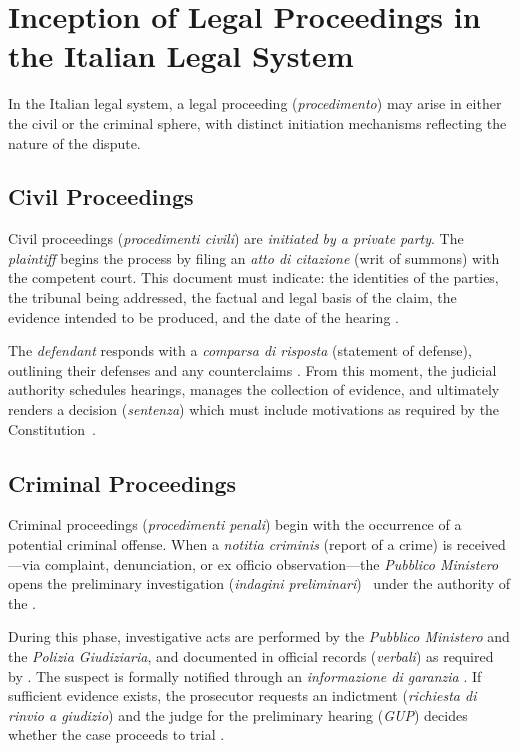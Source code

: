 


\section{Inception of Legal Proceedings in the Italian Legal System}

In the Italian legal system, a legal proceeding (\textit{procedimento}) may arise in either the civil or the criminal sphere, with distinct initiation mechanisms reflecting the nature of the dispute.

\subsection{Civil Proceedings}

Civil proceedings (\textit{procedimenti civili}) are \emph{initiated by a private party}. The \emph{plaintiff} begins the process by filing an \textit{atto di citazione} (writ of summons) with the competent court. This document must indicate: the identities of the parties, the tribunal being addressed, the factual and legal basis of the claim, the evidence intended to be produced, and the date of the hearing \cite[Article 163]{CPC}. 

The \emph{defendant} responds with a \textit{comparsa di risposta} (statement of defense), outlining their defenses and any counterclaims \cite[Article 167]{CPC}. From this moment, the judicial authority schedules hearings, manages the collection of evidence, and ultimately renders a decision (\textit{sentenza}) which must include motivations as required by the Constitution~\cite[Article 111]{Costituzione}.

\subsection{Criminal Proceedings}

Criminal proceedings (\textit{procedimenti penali}) begin with the occurrence of a potential criminal offense. When a \emph{notitia criminis} (report of a crime) is received---via complaint, denunciation, or ex officio observation---the \textit{Pubblico Ministero} opens the preliminary investigation (\textit{indagini preliminari})~\cite[Article 326]{CPP} under the authority of the \textcite{CPP}. 

During this phase, investigative acts are performed by the \textit{Pubblico Ministero} and the \textit{Polizia Giudiziaria}, and documented in official records (\textit{verbali}) as required by \cite[Article 373]{CPP}. The suspect is formally notified through an \textit{informazione di garanzia} \cite[Article 369]{CPP}. If sufficient evidence exists, the prosecutor requests an indictment (\textit{richiesta di rinvio a giudizio}) and the judge for the preliminary hearing (\textit{GUP}) decides whether the case proceeds to trial \cite[Article 416]{CPP}.




